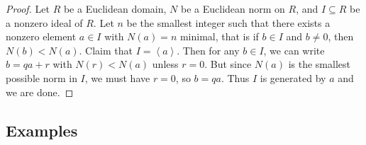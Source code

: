 \documentclass{article}
\newcommand{\rb}[1]{\left( #1 \right)}
\newcommand{\ab}[1]{\left\langle #1 \right\rangle}
\theoremstyle{definition}\newtheorem{definition}{Definition}[subsection]
\theoremstyle{definition}\newtheorem{remark}[definition]{Remark}
\theoremstyle{definition}\newtheorem*{example}{Example}
\theoremstyle{definition}\newtheorem*{note}{Note}
\begin{document}
\begin{proof}
Let $ R $ be a Euclidean domain, $ N $ be a Euclidean norm on $ R $, and $ I \subseteq R $ be a nonzero ideal of $ R $. Let $ n $ be the smallest integer such that there exists a nonzero element $ a \in I $ with $ N\rb{a} = n $ minimal, that is if $ b \in I $ and $ b \ne 0 $, then $ N\rb{b} < N\rb{a} $. Claim that $ I = \ab{a} $. Then for any $ b \in I $, we can write $ b = qa + r $ with $ N\rb{r} < N\rb{a} $ unless $ r = 0 $. But since $ N\rb{a} $ is the smallest possible norm in $ I $, we must have $ r = 0 $, so $ b = qa $. Thus $ I $ is generated by $ a $ and we are done.
\end{proof}

\subsection{Examples}
\end{document}
